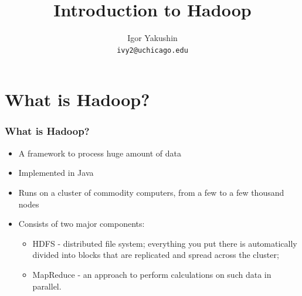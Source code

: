 \documentclass{beamer}
\title{\huge{Introduction to Hadoop}}
\author{Igor Yakushin \\ \texttt{ivy2@uchicago.edu}}
\begin{document}



\begin{frame}
\titlepage
\end{frame}


%

\section{What is Hadoop?}
\begin{frame}
  \frametitle{What is Hadoop?}
  \begin{itemize}
   \item A framework to process huge amount of data
   \item Implemented in Java
   \item Runs on a cluster of commodity computers, from a few to a few thousand nodes
   \item Consists of two major components:
    \begin{itemize}
      \item {\color{mycolordef}HDFS} - distributed file system; everything you put there is automatically divided into blocks that are replicated and spread across the cluster;
      \item {\color{mycolordef}MapReduce} - an approach to perform calculations on such data in parallel.
    \end{itemize}
  \end{itemize}
\end{frame}
\end{document}
